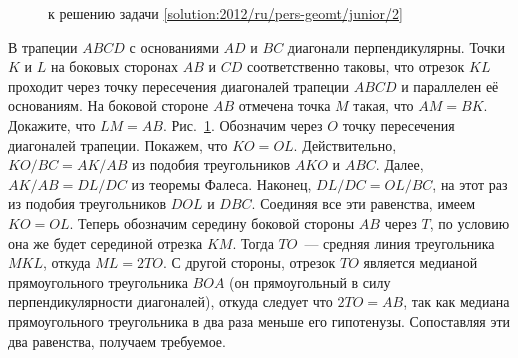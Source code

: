 \ifsolution
\begin{figure}\centering
    \caption{к решению задачи \ref{solution:2012/ru/pers-geomt/junior/2}}
    \label{fig:solution:2012/ru/pers-geomt/junior/2}
\end{figure}
\fi %

\problem
В трапеции $ABCD$ с основаниями $AD$ и $BC$ диагонали перпендикулярны.
Точки $K$ и $L$ на боковых сторонах $AB$ и $CD$ соответственно таковы, что
отрезок $KL$ проходит через точку пересечения диагоналей трапеции $ABCD$ и
параллелен её основаниям.
На боковой стороне $AB$ отмечена точка $M$ такая, что $AM = BK$.
Докажите, что $LM = AB$.
\solution
\label{solution:2012/ru/pers-geomt/junior/2}%
Рис.~\ref{fig:solution:2012/ru/pers-geomt/junior/2}.
Обозначим через $O$ точку пересечения диагоналей трапеции.
Покажем, что $KO = OL$.
Действительно, $KO / BC = AK / AB$ из подобия треугольников
$AKO$ и $ABC$.
Далее, $AK / AB = DL / DC$ из теоремы Фалеса.
Наконец, $DL / DC = OL / BC$, на этот раз из подобия
треугольников $DOL$ и $DBC$.
Соединяя все эти равенства, имеем $KO = OL$.
Теперь обозначим середину боковой стороны $AB$ через $T$, по условию она же
будет серединой отрезка $KM$.
Тогда $TO$~--- средняя линия треугольника $MKL$, откуда $ML = 2 TO$.
С другой стороны, отрезок $TO$ является медианой прямоугольного треугольника
$BOA$
(он прямоугольный в силу перпендикулярности диагоналей),
откуда следует что $2 TO = AB$, так как медиана прямоугольного треугольника в
два раза меньше его гипотенузы.
Сопоставляя эти два равенства, получаем требуемое.
\endproblem
